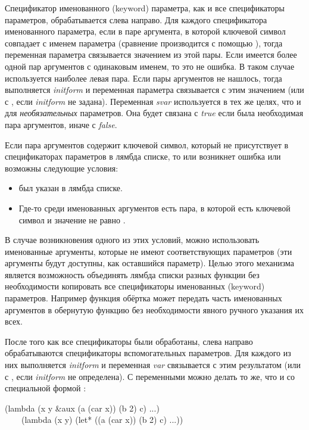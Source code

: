 Спецификатор именованного (keyword) параметра, как и все спецификаторы
параметров, обрабатывается слева направо.
Для каждого спецификатора именованного параметра, если в паре аргумента, в
которой ключевой символ совпадает с именем параметра (сравнение производится с
помощью ), тогда переменная параметра связывается значением из этой
пары.
Если имеется более одной пар аргументов с одинаковым именем, то это не ошибка. В таком
случае используется наиболее левая пара.
Если пары аргументов не нашлось, тогда выполняется \emph{initform} и
переменная параметра связывается с этим значением (или с {\false}, если
\emph{initform} не задана). Переменная \emph{svar} используется в тех же
целях, что и для \emph{необязательных} параметров. Она будет связана с
\emph{true} если была необходимая пара аргументов, иначе с \emph{false}.

Если пара аргументов содержит ключевой символ, который не
присутствует в спецификаторах параметров в лямбда списке, то или возникнет
ошибка или возможны следующие условия:

\begin{itemize}
\item
{} был указан в лямбда списке.

\item
Где-то среди именованных аргументов есть пара, в которой есть ключевой символ
 и значение не равно {\false}.
\end{itemize}

В случае возникновения одного из этих условий, можно использовать именованные
аргументы, которые не имеют соответствующих параметров (эти аргументы будут
доступны, как оставшийся  параметр). 
Целью этого механизма является возможность объединять лямбда списки разных
функции без необходимости копировать все спецификаторы именованных (keyword)
параметров. Например функция обёртка может передать часть именованных аргументов
в обернутую функцию без необходимости явного ручного указания их всех. 

После того как все спецификаторы были обработаны, слева направо обрабатываются
спецификаторы вспомогательных параметров. Для каждого из них выполняется
\emph{initform} и переменная \emph{var} связывается с этим результатом (или
с {\false}, если \emph{initform} не определена). С  переменными
можно делать то же, что и со специальной формой :
\begin{lisp}
(lambda (x y \&aux (a (car x)) (b 2) c) ...) \\
~~~\EQ\ (lambda (x y) (let* ((a (car x)) (b 2) c) ...))
\end{lisp}

